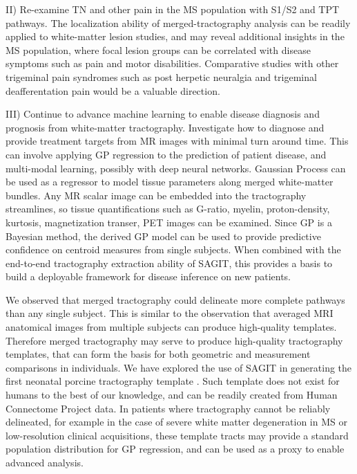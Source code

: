 II) Re-examine TN and other pain in the MS population with S1/S2 and TPT pathways. The localization ability of merged-tractography analysis can be readily applied to white-matter lesion studies, and may reveal additional insights in the MS population, where focal lesion groups can be correlated with disease symptoms such as pain and motor disabilities. Comparative studies with other trigeminal pain syndromes such as post herpetic neuralgia and trigeminal deafferentation pain would be a valuable direction.

III) Continue to advance machine learning to enable disease diagnosis and prognosis from white-matter tractography. Investigate how to diagnose and provide treatment targets from MR images with minimal turn around time. This can involve applying GP regression to the prediction of patient disease, and multi-modal learning, possibly with deep neural networks. Gaussian Process can be used as a regressor to model tissue parameters along merged white-matter bundles. Any MR scalar image can be embedded into the tractography streamlines, so tissue quantifications such as G-ratio, myelin, proton-density, kurtosis, magnetization transer, PET images can be examined. Since GP is a Bayesian method, the derived GP model can be used to provide predictive confidence on centroid measures from single subjects. When combined with the end-to-end tractography extraction ability of SAGIT, this provides a basis to build a deployable framework for disease inference on new patients. 


We observed that merged tractography could delineate more complete pathways than any single subject. This is similar to the observation that averaged MRI anatomical images from multiple subjects can produce high-quality templates. Therefore merged tractography may serve to produce high-quality tractography templates, that can form the basis for both geometric and measurement comparisons in individuals. We have explored the use of SAGIT in generating the first neonatal porcine tractography template \cite{Zhong2016a}. Such template does not exist for humans to the best of our knowledge, and can be readily created from Human Connectome Project data. In patients where tractography cannot be reliably delineated, for example in the case of severe white matter degeneration in MS or low-resolution clinical acquisitions, these template tracts may provide a standard population distribution for GP regression, and can be used as a proxy to enable advanced analysis.

